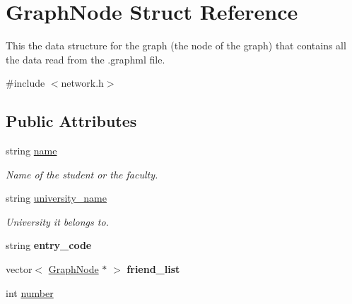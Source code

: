 \hypertarget{structGraphNode}{\section{\-Graph\-Node \-Struct \-Reference}
\label{structGraphNode}
}


\-This the data structure for the graph (the node of the graph) that contains all the data read from the .graphml file.  




{\ttfamily \#include $<$network.\-h$>$}

\subsection*{\-Public \-Attributes}
\begin{DoxyCompactItemize}
\item 
\hypertarget{structGraphNode_ad9d6e2da5d509aa0900057163b14aef8}{string \hyperlink{structGraphNode_ad9d6e2da5d509aa0900057163b14aef8}{name}}\label{structGraphNode_ad9d6e2da5d509aa0900057163b14aef8}

\begin{DoxyCompactList}\small\item\em \-Name of the student or the faculty. \end{DoxyCompactList}\item 
\hypertarget{structGraphNode_aba4ea9c5f3c1c68e61067add47287e93}{string \hyperlink{structGraphNode_aba4ea9c5f3c1c68e61067add47287e93}{university\-\_\-name}}\label{structGraphNode_aba4ea9c5f3c1c68e61067add47287e93}

\begin{DoxyCompactList}\small\item\em \-University it belongs to. \end{DoxyCompactList}\item 
\hypertarget{structGraphNode_a7ff607d39e5d42e3a28bddec68f6c5eb}{string {\bfseries entry\-\_\-code}}\label{structGraphNode_a7ff607d39e5d42e3a28bddec68f6c5eb}

\item 
\hypertarget{structGraphNode_a3ffe69b1e0d4df5a623e9b4601e8ce01}{vector$<$ \hyperlink{structGraphNode}{\-Graph\-Node} $\ast$ $>$ {\bfseries friend\-\_\-list}}\label{structGraphNode_a3ffe69b1e0d4df5a623e9b4601e8ce01}

\item 
\hypertarget{structGraphNode_a094724105a443ea69ba95d0d98356f93}{int \hyperlink{structGraphNode_a094724105a443ea69ba95d0d98356f93}{number}}\label{structGraphNode_a094724105a443ea69ba95d0d98356f93}


\end{DoxyCompactItemize}

